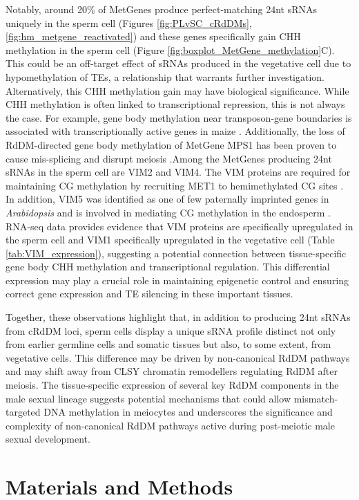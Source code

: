 Notably, around 20\% of MetGenes produce perfect-matching 24nt sRNAs uniquely in the sperm cell (Figures \ref{fig:PLvSC_cRdDMs}, \ref{fig:hm_metgene_reactivated}) and these genes specifically gain CHH methylation in the sperm cell (Figure \ref{fig:boxplot_MetGene_methylation}C). This could be an off-target effect of sRNAs produced in the vegetative cell due to hypomethylation of TEs, a relationship that warrants further investigation. Alternatively, this CHH methylation gain may have biological significance. While CHH methylation is often linked to transcriptional repression, this is not always the case.  For example, gene body methylation near transposon-gene boundaries is associated with transcriptionally active genes in maize \cite{RN277}. Additionally, the loss of RdDM-directed gene body methylation of MetGene MPS1 has been proven to cause mis-splicing and disrupt meiosis \cite{RN199}.Among the MetGenes producing 24nt sRNAs in the sperm cell are VIM2 and VIM4. The VIM proteins are required for maintaining CG methylation by recruiting MET1 to hemimethylated CG sites \cite{RN276}. In addition, VIM5 was identified as one of few paternally imprinted genes in \textit{Arabidopsis} and is involved in mediating CG methylation in the endosperm \cite{RN275}. RNA-seq data provides evidence that VIM proteins are specifically upregulated in the sperm cell and VIM1 specifically upregulated in the vegetative cell (Table \ref{tab:VIM_expression}), suggesting a potential connection between tissue-specific gene body CHH methylation and transcriptional regulation. This differential expression may play a crucial role in maintaining epigenetic control and ensuring correct gene expression and TE silencing in these important tissues.

Together, these observations highlight that, in addition to producing 24nt sRNAs from cRdDM loci, sperm cells display a unique sRNA profile  distinct not only from earlier germline cells and somatic tissues but also, to some extent, from vegetative cells. This difference may be driven by non-canonical RdDM pathways and may shift away from CLSY chromatin remodellers regulating RdDM after meiosis. The tissue-specific expression of several key RdDM components in the male sexual lineage suggests potential mechanisms that could allow mismatch-targeted DNA methylation in meiocytes and underscores the significance and complexity of non-canonical RdDM pathways active during post-meiotic male sexual development.

\clearpage

\section{Materials and Methods}

